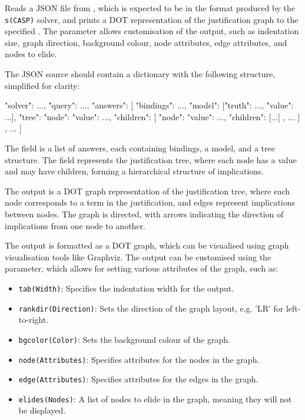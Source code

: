 \begin{description}
Reads a JSON file from , which is expected to be in the format
produced by the \verb$s(CASP)$ solver, and prints a DOT representation of the
justification graph to the specified . The  parameter
allows customisation of the output, such as indentation size, graph
direction, background colour, node attributes, edge attributes, and
nodes to elide.

The JSON source should contain a dictionary with the following structure,
simplified for clarity:

\begin{code}
{
    "solver": {...},
    "query": {...},
    "answers": [
        {
            "bindings": {...},
            "model": [{"truth": ..., "value": {...}}],
            "tree": {
                "node": {"value": {...}},
                "children": [
                    {
                        "node": {"value": {...}},
                        "children": [...]
                    },
                    ...
                ]
            }
        },
        ...
    ]
}
\end{code}

The  field is a list of answers, each containing bindings, a
model, and a tree structure. The  field represents the
justification tree, where each node has a value and may have children,
forming a hierarchical structure of implications.

The output is a DOT graph representation of the justification tree,
where each node corresponds to a term in the justification, and edges
represent implications between nodes. The graph is directed, with arrows
indicating the direction of implications from one node to another.

The output is formatted as a DOT graph, which can be visualised using
graph visualisation tools like Graphviz. The output can be customised
using the  parameter, which allows for setting various attributes
of the graph, such as:

\begin{itemize}
    \item \verb$tab(Width)$: Specifies the indentation width for the output.
    \item \verb$rankdir(Direction)$: Sets the direction of the graph layout, e.g.
'LR' for left-to-right.
    \item \verb$bgcolor(Color)$: Sets the background colour of the graph.
    \item \verb$node(Attributes)$: Specifies attributes for the nodes in the graph.
    \item \verb$edge(Attributes)$: Specifies attributes for the edges in the graph.
    \item \verb$elides(Nodes)$: A list of nodes to elide in the graph, meaning they
will not be displayed.
\end{itemize}


\end{description}
